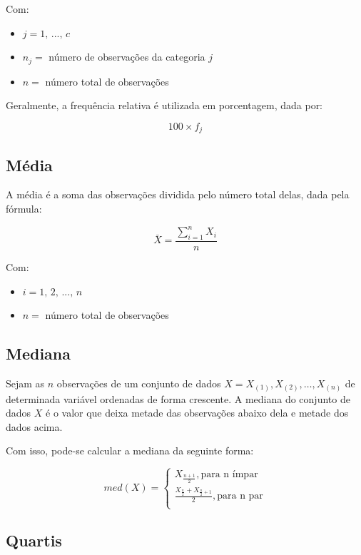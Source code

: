 \documentclass[
]{estat/estat}
\begin{document}
Com:

\begin{itemize}
\item
  \(j = 1, \, ..., \, c\)
\item
  \(n_j =\) número de observações da categoria \(j\)
\item
  \(n =\) número total de observações
\end{itemize}

Geralmente, a frequência relativa é utilizada em porcentagem, dada por:

\[100 \times f_j\]

\subsection{Média}\label{muxe9dia}

A média é a soma das observações dividida pelo número total delas, dada
pela fórmula:

\[\bar{X}=\frac{\sum\limits_{i=1}^{n}X_i}{n}\]

Com:

\begin{itemize}
\item
  \(i = 1, \, 2, \, ..., \, n\)
\item
  \(n =\) número total de observações
\end{itemize}

\subsection{Mediana}\label{mediana}

Sejam as \(n\) observações de um conjunto de dados
\(X=X_{(1)},X_{(2)},\ldots, X_{(n)}\) de determinada variável ordenadas
de forma crescente. A mediana do conjunto de dados \(X\) é o valor que
deixa metade das observações abaixo dela e metade dos dados acima.

Com isso, pode-se calcular a mediana da seguinte forma:

\[
med(X) =
    \begin{cases}
         X_{\frac{n+1}{2}}, \textrm{para n ímpar} \\
         \frac{X_{\frac{n}{2}}+X_{\frac{n}{2} + 1}}{2}, \textrm{para n par} \\
    \end{cases}
\]

\subsection{Quartis}\label{quartis}
\end{document}

